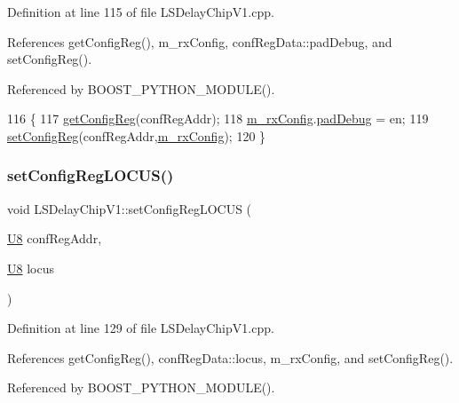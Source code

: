 Definition at line 115 of file L\+S\+Delay\+Chip\+V1.\+cpp.



References get\+Config\+Reg(), m\+\_\+rx\+Config, conf\+Reg\+Data\+::pad\+Debug, and set\+Config\+Reg().



Referenced by B\+O\+O\+S\+T\+\_\+\+P\+Y\+T\+H\+O\+N\+\_\+\+M\+O\+D\+U\+L\+E().


\begin{DoxyCode}
116 \{
117     \hyperlink{classLSDelayChipV1_a4f338071d49df7eae55020a5f5fa8474}{getConfigReg}(confRegAddr);
118     \hyperlink{classLSDelayChipV1_a4818ac5c0d7ccf2845a01226234bdb67}{m\_rxConfig}.\hyperlink{structconfRegData_a4e98d082c44e34995224bd242da493d0}{padDebug} = en;
119     \hyperlink{classLSDelayChipV1_a11fa2ebfa37c5cf0544ddb68c7d43e94}{setConfigReg}(confRegAddr,\hyperlink{classLSDelayChipV1_a4818ac5c0d7ccf2845a01226234bdb67}{m\_rxConfig});
120 \}
\end{DoxyCode}
\mbox{\label{classLSDelayChipV1_a2a1eebeacb7ed2b0fc5584f3630d0aa0}} 
\subsubsection{\texorpdfstring{set\+Config\+Reg\+L\+O\+C\+U\+S()}{setConfigRegLOCUS()}}
{\footnotesize\ttfamily void L\+S\+Delay\+Chip\+V1\+::set\+Config\+Reg\+L\+O\+C\+US (\begin{DoxyParamCaption}\item[{\hyperlink{ICECALv3_8h_a3cb25ca6f51f003950f9625ff05536fc}{U8}}]{conf\+Reg\+Addr,  }\item[{\hyperlink{ICECALv3_8h_a3cb25ca6f51f003950f9625ff05536fc}{U8}}]{locus }\end{DoxyParamCaption})}



Definition at line 129 of file L\+S\+Delay\+Chip\+V1.\+cpp.



References get\+Config\+Reg(), conf\+Reg\+Data\+::locus, m\+\_\+rx\+Config, and set\+Config\+Reg().



Referenced by B\+O\+O\+S\+T\+\_\+\+P\+Y\+T\+H\+O\+N\+\_\+\+M\+O\+D\+U\+L\+E().


